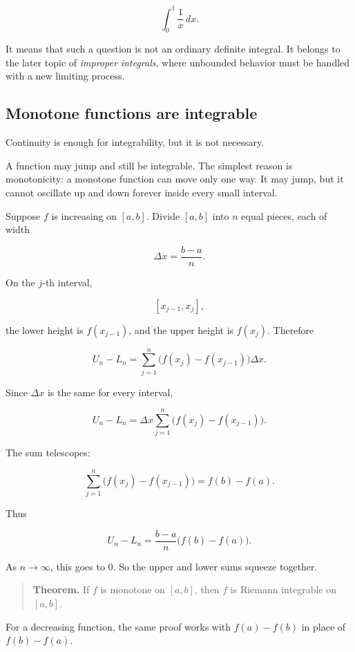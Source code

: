 \[
\int_0^1 \frac1x\,dx.
\]

It means that such a question is not an ordinary definite integral.  It belongs to the
later topic of \emph{improper integrals}, where unbounded behavior must be handled
with a new limiting process.

\subsection{Monotone functions are integrable}
\label{subsec:monotone-functions-integrable}

Continuity is enough for integrability, but it is not necessary.

A function may jump and still be integrable.  The simplest reason is monotonicity:
a monotone function can move only one way.  It may jump, but it cannot oscillate
up and down forever inside every small interval.

Suppose \(f\) is increasing on \([a,b]\).  Divide \([a,b]\) into \(n\) equal pieces, each
of width

\[
\Delta x=\frac{b-a}{n}.
\]

On the \(j\)-th interval,

\[
[x_{j-1},x_j],
\]

the lower height is \(f(x_{j-1})\), and the upper height is \(f(x_j)\).  Therefore

\[
U_n-L_n
=
\sum_{j=1}^{n}\bigl(f(x_j)-f(x_{j-1})\bigr)\Delta x.
\]

Since \(\Delta x\) is the same for every interval,

\[
U_n-L_n
=
\Delta x
\sum_{j=1}^{n}\bigl(f(x_j)-f(x_{j-1})\bigr).
\]

The sum telescopes:

\[
\sum_{j=1}^{n}\bigl(f(x_j)-f(x_{j-1})\bigr)
=
f(b)-f(a).
\]

Thus

\[
U_n-L_n
=
\frac{b-a}{n}\bigl(f(b)-f(a)\bigr).
\]

As \(n\to\infty\), this goes to \(0\).  So the upper and lower sums squeeze together.

\begin{quote}
\textbf{Theorem.}
If \(f\) is monotone on \([a,b]\), then \(f\) is Riemann integrable on \([a,b]\).
\end{quote}

For a decreasing function, the same proof works with \(f(a)-f(b)\) in place of
\(f(b)-f(a)\).

